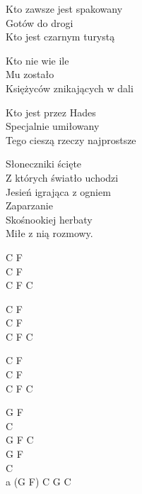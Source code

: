 \begin{textn}
    Kto zawsze jest spakowany\\
    Gotów do drogi\\
    Kto jest czarnym turystą

    Kto nie wie ile\\
    Mu zostało\\
    Księżyców znikających w dali

    Kto jest przez Hades\\
    Specjalnie umiłowany\\
    Tego cieszą rzeczy najprostsze

    Słoneczniki ścięte\\
    Z których światło uchodzi\\
    Jesień igrająca z ogniem\\
    Zaparzanie\\
    Skośnookiej herbaty\\
    Miłe z nią rozmowy.
\end{textn}
\begin{chordw}
    C F\\
    C F\\
    C F C

    C F\\
    C F\\
    C F C

    C F\\
    C F\\
    C F C

    G F\\
    C\\
    G F C\\
    G F\\
    C\\
    a (G F) C G C
\end{chordw}